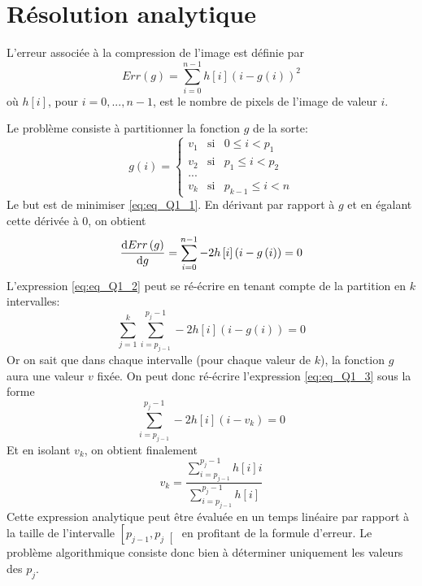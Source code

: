 \documentclass[a4paper, 12pt]{article}
\begin{document}
	\section{Résolution analytique}
	\label{sec:sec_Q1}
	L'erreur associée à la compression de l'image est définie par
	\begin{equation}
	    \label{eq:eq_Q1_1}
	    Err\left(g\right) = \sum_{i=0}^{n-1}h\left[i\right]\left(i-g\left(i\right)\right)^2
	\end{equation}
	où \(h\left[i\right]\), pour \(i = 0, ..., n-1\), est le nombre de pixels de l'image de valeur \(i\).\par
	Le problème consiste à partitionner la fonction \(g\) de la sorte:
	\begin{displaymath}
	    g\left ( i \right ) =
        \left\{\begin{matrix}
        v_1 & \text{si}  & 0\leq i<p_1\\ 
        v_2 & \text{si} & p_1\leq i<p_2\\ 
        ... &  & \\ 
        v_k & \text{si} & p_{k-1}\leq i<n
        \end{matrix}\right.
    \end{displaymath}
    Le but est de minimiser \eqref{eq:eq_Q1_1}. En dérivant par rapport à \(g\) et en égalant cette dérivée à 0, on obtient
    \begin{equation}
        \label{eq:eq_Q1_2}
        \dfrac{\mathrm{d} Err\left(g\right)}{\mathrm{d} g} = \sum_{i=0}^{n-1}-2h\left[i\right]\left(i-g\left(i\right)\right) = 0
    \end{equation}
    L'expression \eqref{eq:eq_Q1_2} peut se ré-écrire en tenant compte de la partition en \(k\) intervalles:
    \begin{equation}
        \label{eq:eq_Q1_3}
        \sum_{j=1}^{k}\sum_{i=p_{j-1}}^{p_j-1}-2h\left[i\right]\left(i-g\left(i\right)\right) = 0
    \end{equation}
    Or on sait que dans chaque intervalle (pour chaque valeur de \(k\)), la fonction \(g\) aura une valeur \(v\) fixée. On peut donc ré-écrire l'expression \eqref{eq:eq_Q1_3} sous la forme
    \begin{displaymath}
        \sum_{i=p_{j-1}}^{p_j-1}-2h\left[i\right]\left(i-v_k\right) = 0
    \end{displaymath}
    Et en isolant \(v_k\), on obtient finalement
    \begin{equation}
        \label{eq:eq_Q1_4}
        v_k = \dfrac{\sum_{i=p_{j-1}}^{p_j-1}h\left[i\right]i}{\sum_{i=p_{j-1}}^{p_j-1}h\left[i\right]}
    \end{equation}
    Cette expression analytique peut être évaluée en un temps linéaire par rapport à la taille de l'intervalle \(\left[p_{j-1},p_j\right[\) en profitant de la formule d'erreur. Le problème algorithmique consiste donc bien à déterminer uniquement les valeurs des \(p_j\).
    
\end{document}
